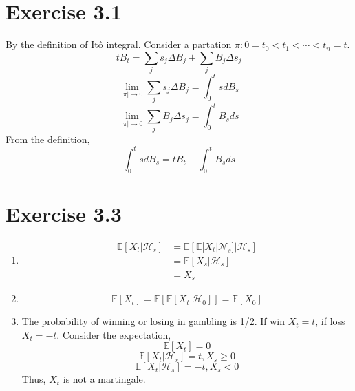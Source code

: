 \documentclass{article}
\begin{document}
\section*{Exercise 3.1}
	By the definition of It\^{o} integral. Consider a partation $\pi: 0 = t_0 < t_1 < \cdots < t_n = t$.
	$$tB_t = \sum_{j} s_j \Delta B_j + \sum_{j} B_j \Delta s_j$$
	$$\lim_{|\pi|\to 0} \sum_{j} s_j \Delta B_j = \int_0^t sdB_s$$
	$$\lim_{|\pi|\to 0} \sum_{j} B_j \Delta s_j = \int_0^t B_sds$$
	From the definition,
	$$\int_0^t sdB_s = tB_t - \int_0^t B_sds$$

\section*{Exercise 3.3}
	\begin{enumerate}
		\item \begin{align*}
			\mathbb{E}\left[X_t|\mathcal{H}_s\right]
			& = \mathbb{E}\left[\mathbb{E}[X_t|\mathcal{N}_s]|\mathcal{H}_s\right]\\
			& = \mathbb{E}\left[X_s|\mathcal{H}_s\right]\\
			& = X_s
		\end{align*}
		\item $$\mathbb{E}[X_t] = \mathbb{E}\left[\mathbb{E}[X_t|\mathcal{H}_0]\right] = \mathbb{E}[X_0]$$
		\item The probability of winning or losing in gambling is 1/2. If win $X_t = t$, if loss $X_t = -t$. Consider the expectation,
		$$\mathbb{E}[X_t] = 0$$
		$$\mathbb{E}[X_t|\mathcal{H}_s] = t , X_s \geqslant 0$$
		$$\mathbb{E}[X_t|\mathcal{H}_s] = -t , X_s < 0$$
		Thus, $X_t$ is not a martingale.
	\end{enumerate}
\end{document}

